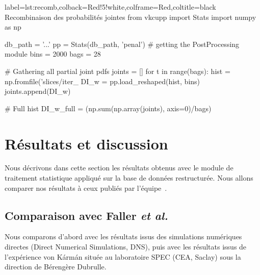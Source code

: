 \documentclass[13pt, a4paper]{extarticle}
\begin{document}
\vspace{.2cm}

\noindent\begin{pythoncode}{label=lst:recomb,colback=Red!5!white,colframe=Red,coltitle=black}
  {Recombinaison des probabilités jointes}
  from vkcupp import Stats
  import numpy as np
  
  db_path = '...'
  pp = Stats(db_path, 'penal')           # getting the PostProcessing module
  bins = 2000
  bags = 28

  # Gathering all partial joint pdfs
  joints = []
  for t in range(bags):
    hist = np.fromfile('slices/iter_%
    DI_w = pp.load_reshaped(hist, bins)
    joints.append(DI_w)

  # Full hist
  DI_w_full = (np.sum(np.array(joints), axis=0)/bags)
\end{pythoncode}

\section{Résultats et discussion}\label{sec:results}
Nous décrivons dans cette section les résultats obtenus avec le module de traitement 
statistique appliqué sur la base de données restructurée. Nous allons comparer nos 
résultats à ceux publiés par l'équipe~\cite{Faller-Intermittency}.

\subsection{Comparaison avec Faller \emph{et al.}~\cite{Faller-Intermittency}}
Nous comparons d'abord avec les résultats issus des simulations numériques directes 
(Direct Numerical Simulations, DNS), puis avec les résultats issus de l'expérience
 von Kármán située au laboratoire SPEC (CEA, Saclay) sous la direction de Bérengère Dubrulle.
\end{document}
